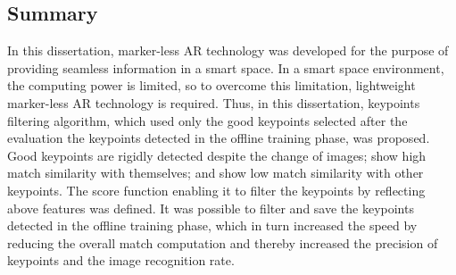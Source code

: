 
\subsection{Summary}


In this dissertation, marker-less AR technology was developed for the purpose of providing seamless information in a smart space. In a smart space environment, the computing power is limited, so to overcome this limitation, lightweight marker-less AR technology is required. Thus, in this dissertation, keypoints filtering algorithm, which used only the good keypoints selected after the evaluation the keypoints detected in the offline training phase, was proposed. Good keypoints are rigidly detected despite the change of images; show high match similarity with themselves; and show low match similarity with other keypoints. The score function enabling it to filter the keypoints by reflecting above features was defined. It was possible to filter and save the keypoints detected in the offline training phase, which in turn increased the speed by reducing the overall match computation and thereby increased the precision of keypoints and the image recognition rate.  
